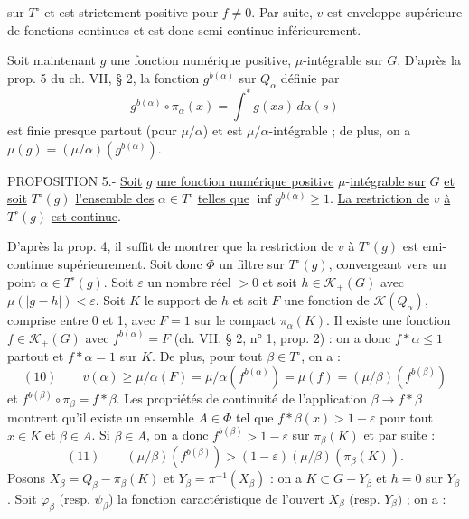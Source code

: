 sur $T^\circ$ et est strictement positive pour $f\ne 0$. Par suite, $v$ est enveloppe supérieure de fonctions continues et est donc semi-continue inférieurement.

Soit maintenant $g$ une fonction numérique positive, $\mu$-intégrable sur $G$. D'après la prop. 5 du ch. VII, § 2, la fonction $g^{b(\alpha)}$ sur $Q_\alpha$ définie par
\[
g^{b(\alpha)}\circ\pi_\alpha(x)=\int^*g(xs)\,d\alpha(s)
\]
est finie presque partout (pour $\mu/\alpha$) et est $\mu/\alpha$-intégrable ; de plus, on a $\mu(g)=(\mu/\alpha)(g^{b(\alpha)})$.

PROPOSITION 5.- \uline{Soit} $g$ \uline{une fonction numérique positive} $\mu$-\uline{intégrable sur} $G$ \uline{et soit} $T^\circ(g)$ \uline{l'ensemble des} $\alpha\in T^\circ$ \uline{telles que} $\inf g^{b(\alpha)}\geq 1$. \uline{La restriction de} $v$ \uline{à} $T^\circ(g)$ \uline{est continue}.

D'après la prop. 4, il suffit de montrer que la restriction de $v$ à $T^\circ(g)$ est emi-continue supérieurement. Soit donc $\Phi$ un filtre sur $T^\circ(g)$, convergeant vers un point $\alpha\in T^\circ(g)$. Soit $\varepsilon$ un nombre réel $>0$ et soit $h\in\mathcal K_+(G)$ avec $\mu(|g-h|)<\varepsilon$. Soit $K$ le support de $h$ et soit $F$ une fonction de $\mathcal K(Q_\alpha)$, comprise entre 0 et 1, avec $F=1$ sur le compact $\pi_\alpha(K)$. Il existe une fonction $f\in\mathcal K_+(G)$ avec $f^{b(\alpha)}=F$ (ch. VII, § 2, n° 1, prop. 2) : on a donc $f*\alpha\leq 1$ partout et $f*\alpha=1$ sur $K$. De plus, pour tout $\beta\in T^\circ$, on a :
\[
(10)\qquad v(\alpha)\geq\mu/\alpha(F)=\mu/\alpha(f^{b(\alpha)})=\mu(f)=(\mu/\beta)(f^{b(\beta)})
\]
et $f^{b(\beta)}\circ\pi_\beta=f*\beta$. Les propriétés de continuité de l'application $\beta\longrightarrow f*\beta$ montrent qu'il existe un ensemble $A\in\Phi$ tel que $f*\beta(x)>1-\varepsilon$ pour tout $x\in K$ et $\beta\in A$. Si $\beta\in A$, on a donc $f^{b(\beta)}>1-\varepsilon$ sur $\pi_\beta(K)$ et par suite :
\[
(11)\qquad (\mu/\beta)(f^{b(\beta)})>(1-\varepsilon)(\mu/\beta)(\pi_\beta(K)).
\]
Posons $X_\beta=Q_\beta-\pi_\beta(K)$ et $Y_\beta=\pi^{-1}(X_\beta)$ : on a $K\subset G-Y_\beta$ et $h=0$ sur $Y_\beta$.
Soit $\varphi_\beta$ (resp. $\psi_\beta$) la fonction caractéristique de l'ouvert $X_\beta$ (resp. $Y_\beta$) ; on a :
